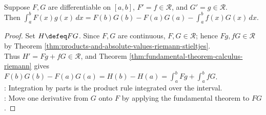 \begin{theorem} \label{thm:riemann-integration-by-parts} \\
Suppose $F,G$ are differentiable on $[a,b]$, $F'=f\in\mathcal{R}$, and $G'=g\in\mathcal{R}$.\\
Then $\int_a^b F(x)g(x)\,dx=F(b)G(b)-F(a)G(a)-\int_a^b f(x)G(x)\,dx$.
\begin{proof}
Set $H\defeq FG$. Since $F,G$ are continuous, $F,G\in\mathcal{R}$; hence $Fg,fG\in\mathcal{R}$ by Theorem \ref{thm:products-and-absolute-values-riemann-stieltjes}.\\
Thus $H'=Fg+fG\in\mathcal{R}$, and Theorem \ref{thm:fundamental-theorem-calculus-riemann} gives $F(b)G(b)-F(a)G(a)=H(b)-H(a)=\int_a^b Fg+\int_a^b fG$.\\
: Integration by parts is the product rule integrated over the interval.\\
: Move one derivative from $G$ onto $F$ by applying the fundamental theorem to $FG$.
\end{proof}
\end{theorem}
